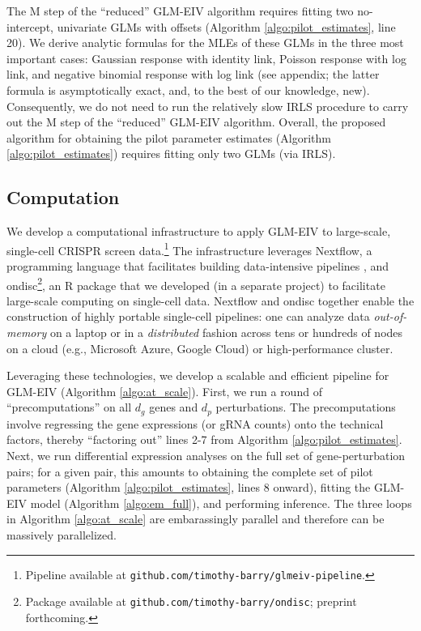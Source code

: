 \documentclass[12pt]{article}
\begin{document}
The M step of the ``reduced'' GLM-EIV algorithm requires fitting two no-intercept, univariate GLMs with offsets (Algorithm \ref{algo:pilot_estimates}, line 20). We derive analytic formulas for the MLEs of these GLMs in the three most important cases: Gaussian response with identity link, Poisson response with log link, and negative binomial response with log link (see appendix; the latter formula is asymptotically exact, and, to the best of our knowledge, new). Consequently, we do not need to run the relatively slow IRLS procedure to carry out the M step of the ``reduced'' GLM-EIV algorithm. Overall, the proposed algorithm for obtaining the pilot parameter estimates (Algorithm \ref{algo:pilot_estimates}) requires fitting only two GLMs (via IRLS).

\subsection{Computation}
We develop a computational infrastructure to apply GLM-EIV to large-scale, single-cell CRISPR screen data.\footnote{Pipeline available at \texttt{github.com/timothy-barry/glmeiv-pipeline}.} The infrastructure leverages Nextflow, a programming language that facilitates building data-intensive pipelines \cite{DITommaso2017}, and ondisc\footnote{Package available at \texttt{github.com/timothy-barry/ondisc}; preprint forthcoming.}, an R package that we developed (in a separate project) to facilitate large-scale computing on single-cell data. Nextflow and ondisc together enable the construction of highly portable single-cell pipelines: one can analyze data \textit{out-of-memory} on a laptop or in a \textit{distributed} fashion across tens or hundreds of nodes on a cloud (e.g., Microsoft Azure, Google Cloud) or high-performance cluster.

Leveraging these technologies, we develop a scalable and efficient pipeline for GLM-EIV (Algorithm \ref{algo:at_scale}). First, we run a round of ``precomputations'' on all $d_g$ genes and $d_p$ perturbations. The precomputations involve regressing the gene expressions (or gRNA counts) onto the technical factors, thereby ``factoring out'' lines 2-7 from Algorithm \ref{algo:pilot_estimates}. Next, we run differential expression analyses on the full set of gene-perturbation pairs; for a given pair, this amounts to obtaining the complete set of pilot parameters (Algorithm \ref{algo:pilot_estimates}, lines 8 onward), fitting the GLM-EIV model (Algorithm \ref{algo:em_full}), and performing inference. The three loops in Algorithm \ref{algo:at_scale} are embarassingly parallel and therefore can be massively parallelized. 
\end{document}

